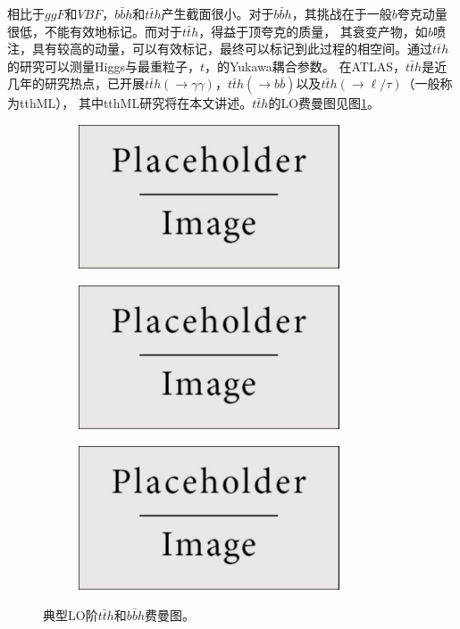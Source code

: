 相比于$ggF$和$VBF$，$b\bar{b}h$和$t\bar{t}h$产生截面很小。对于$b\bar{b}h$，其挑战在于一般$b$夸克动量很低，不能有效地标记。而对于$t\bar{t}h$，得益于顶夸克的质量，
其衰变产物，如$b$喷注，具有较高的动量，可以有效标记，最终可以标记到此过程的相空间。通过$t\bar{t}h$的研究可以测量Higgs与最重粒子，$t$，的Yukawa耦合参数。
在ATLAS，$t\bar{t}h$是近几年的研究热点，已开展$t\bar{t}h(\rightarrow\gamma\gamma)$，$t\bar{t}h(\rightarrow b\bar{b})$以及$t\bar{t}h(\rightarrow \ell/\tau)$（一般称为tthML），
其中tthML研究将在本文讲述。$t\bar{t}h$的LO费曼图见图\ref{fig:diagram_tth}。\\
\begin{figure}[h]
\centering
 \begin{subfigure}[b]{0.33\textwidth}
  \includegraphics[width=0.85\textwidth]{fig/placeholder.pdf}
  \caption{}
 \end{subfigure}
 \begin{subfigure}[b]{0.33\textwidth}
  \includegraphics[width=0.85\textwidth]{fig/placeholder.pdf}
  \caption{}
 \end{subfigure}
 \begin{subfigure}[b]{0.33\textwidth}
  \includegraphics[width=0.85\textwidth]{fig/placeholder.pdf}
  \caption{}
 \end{subfigure}
\caption{典型LO阶$t\bar{t}h$和$b\bar{b}h$费曼图。}
\label{fig:diagram_tth}
\end{figure}

